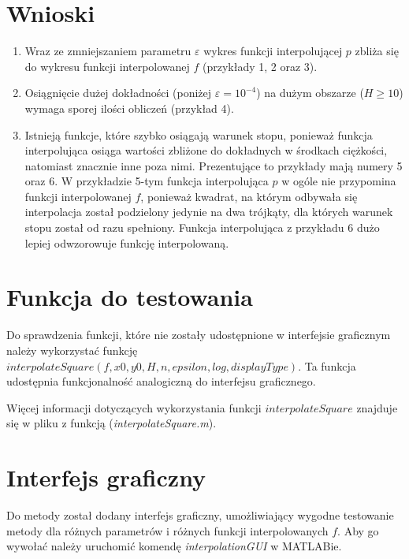 \documentclass[12pt]{article}
\begin{document}
	\section{Wnioski}
	\begin{enumerate}
		\item Wraz ze zmniejszaniem parametru $\varepsilon$ wykres funkcji interpolującej $p$ zbliża się do wykresu funkcji interpolowanej $f$ (przykłady 1, 2 oraz 3).
		
		\item Osiągnięcie dużej dokładności (poniżej $\varepsilon = 10^{-4}$) na dużym obszarze ($H \geq 10$) wymaga sporej ilości obliczeń (przykład 4).
		
		\item Istnieją funkcje, które szybko osiągają warunek stopu, ponieważ funkcja interpolująca osiąga wartości zbliżone do dokładnych w środkach ciężkości, natomiast znacznie inne poza nimi. Prezentujące to przykłady mają numery 5 oraz 6. W przykładzie 5-tym funkcja interpolująca $p$ w ogóle nie przypomina funkcji interpolowanej $f$, ponieważ kwadrat, na którym odbywała się interpolacja został podzielony jedynie na dwa trójkąty, dla których warunek stopu został od razu spełniony. Funkcja interpolująca z przykładu 6 dużo lepiej odwzorowuje funkcję interpolowaną.
	\end{enumerate}
	
	\section{Funkcja do testowania}
	Do sprawdzenia funkcji, które nie zostały udostępnione w interfejsie graficznym należy wykorzystać funkcję $interpolateSquare(f, x0, y0, H, n, epsilon, log, displayType)$. Ta funkcja udostępnia funkcjonalność analogiczną do interfejsu graficznego.
	
	Więcej informacji dotyczących wykorzystania funkcji $interpolateSquare$ znajduje się w pliku z funkcją (\textit{interpolateSquare.m}).
	
	\section{Interfejs graficzny}
	Do metody został dodany interfejs graficzny, umożliwiający wygodne testowanie metody dla różnych parametrów i różnych funkcji interpolowanych $f$. Aby go wywołać należy uruchomić komendę \textit{interpolationGUI} w MATLABie.
	
\end{document}
